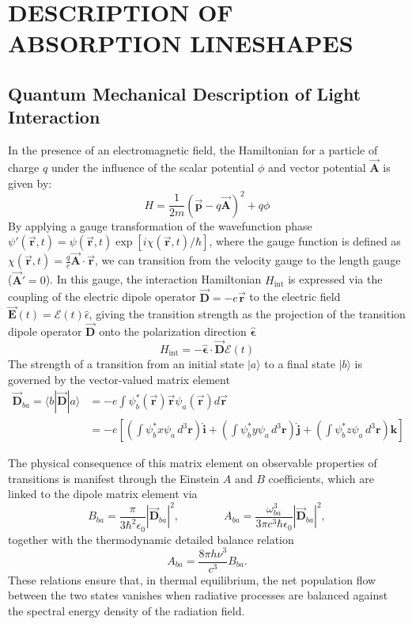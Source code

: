 \documentclass[8pt,a4paper]{report}
\def\rvec{\vec{\mathbf{r}}}
\def\Avec{\vec{\mathbf{A}}}
\begin{document}
	\chapter{DESCRIPTION OF ABSORPTION LINESHAPES}\label{chap:lineshapes}

	\section{Quantum Mechanical Description of Light Interaction}
	In the presence of an electromagnetic field, the Hamiltonian for a particle of charge $q$ under the influence of the scalar potential $\phi$ and vector potential $\Avec$ is given by:
	$$H = \frac{1}{2m}(\vec{\mathbf{p}} - q\Avec)^2 + q \phi$$
	By applying a gauge transformation of the wavefunction phase $\psi'(\rvec,t) = \psi(\rvec,t)\exp[i\chi(\rvec,t)/\hbar]$, where the gauge function is defined as $\chi(\rvec,t) = \frac{q}{e}\Avec \cdot \rvec$, we can transition from the velocity gauge to the length gauge ($\Avec'=0$). In this gauge, the interaction Hamiltonian $H_\mathrm{int}$ is expressed via the coupling of the electric dipole operator $\vec{\mathbf{D}} = - e\rvec$ to the electric field $\vec{\mathbf{E}}(t) = \mathcal{E}(t)\hat{\epsilon}$, giving the transition strength as the projection of the transition dipole operator $\vec{\mathbf{D}}$ onto the polarization direction $\mathbf{\hat{\epsilon}}$
	\begin{equation} \label{interaction_hamiltonian}
		H_\mathrm{int} = -\mathbf{\hat{\epsilon}} \cdot \vec{\mathbf{D}} \mathcal{E}(t)
	\end{equation}
	The strength of a transition from an initial state $|a\rangle$ to a final state $|b\rangle$ is governed by the vector-valued matrix element
	\begin{align}\label{dipoleElement}
		\vec{\mathbf{D}}_{ba} = \langle b|\vec{\mathbf{D}}|a\rangle
		&= -e\int\psi_b^*(\rvec)\rvec\psi_a(\rvec)d\rvec \nonumber\\
		&= -e \left[ \left( \int \psi_b^* x \psi_a \, d^3\mathbf{r} \right) \mathbf{\hat{i}} + \left( \int \psi_b^* y \psi_a \, d^3\mathbf{r} \right) \mathbf{\hat{j}} + \left( \int \psi_b^* z \psi_a \, d^3\mathbf{r} \right) \mathbf{\hat{k}} \right]
	\end{align}
	
	The physical consequence of this matrix element on observable properties of transitions is manifest through the Einstein $A$ and $B$ coefficients, which are linked to the dipole matrix element via	
	\begin{equation} \label{einstein_link}
		B_{ba} = \frac{\pi}{3\hbar^2 \epsilon_0} \left| \vec{\mathbf{D}}_{ba} \right|^2,
		\qquad\qquad
		A_{ba} = \frac{\omega_{ba}^3}{3\pi c^3 \hbar \epsilon_0} \left| \vec{\mathbf{D}}_{ba} \right|^2,
	\end{equation}
	together with the thermodynamic detailed balance relation
	\begin{equation} \label{einstein_balance}
		A_{ba} = \frac{8\pi h \nu^3}{c^3} B_{ba}.
	\end{equation}
	These relations ensure that, in thermal equilibrium, the net population flow between the two states vanishes when radiative processes are balanced against the spectral energy density of the radiation field.
	
\end{document}
